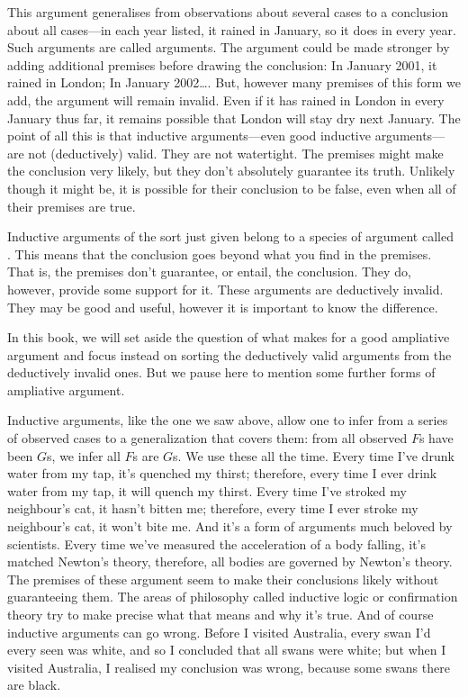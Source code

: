 This argument generalises from observations about several cases to a conclusion about all cases---in each year listed, it rained in January, so it does in every year. Such arguments are called  arguments. The argument could be made stronger by adding additional premises before drawing the conclusion: In January 2001, it rained in London; In January 2002\ldots. But, however many premises of this form we add, the argument will remain invalid. Even if it has rained in London in every January thus far, it remains possible that London will stay dry next January. The point of all this is that inductive arguments—even good inductive arguments—are not (deductively) valid. They are not watertight. The premises might make the conclusion very likely, but they don't absolutely guarantee its truth. Unlikely though it might be, it is possible for their conclusion to be false, even when all of their premises are true.

Inductive arguments of the sort just given belong to a species of argument called . This means that the conclusion goes beyond what you find in the premises. That is, the premises don't guarantee, or entail, the conclusion. They do, however, provide some support for it. These arguments are deductively invalid. They may be good and useful, however it is important to know the difference.

In this book, we will set aside the question of what makes for a good ampliative argument and focus instead on sorting the deductively valid arguments from the deductively invalid ones.
But we pause here to mention some further forms of ampliative argument.

Inductive arguments, like the one we saw above, allow one to infer from a series of observed cases to a generalization that covers them: from all observed $F$s have been $G$s, we infer all $F$s are $G$s. We use these all the time. Every time I've drunk water from my tap, it's quenched my thirst; therefore, every time I ever drink water from my tap, it will quench my thirst. Every time I've stroked my neighbour's cat, it hasn't bitten me; therefore, every time I ever stroke my neighbour's cat, it won't bite me. And it's a form of arguments much beloved by scientists. Every time we've measured the acceleration of a body falling, it's matched Newton's theory, therefore, all bodies are governed by Newton's theory. The premises of these argument seem to make their conclusions likely without guaranteeing them. The areas of philosophy called inductive logic or confirmation theory try to make precise what that means and why it's true. And of course inductive arguments can go wrong. Before I visited Australia, every swan I'd every seen was white, and so I concluded that all swans were white; but when I visited Australia, I realised my conclusion was wrong, because some swans there are black.


